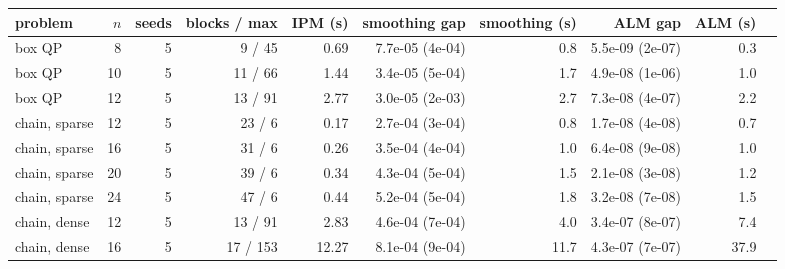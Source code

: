\begin{tabular}{l r r r r r r r r r}\toprule
problem & $n$ & seeds & blocks / max & IPM (s) & smoothing gap & smoothing (s) & ALM gap & ALM (s) \\\midrule
box QP & 8 & 5 & 9 / 45 & 0.69 & 7.7e-05 (4e-04) & 0.8 & 5.5e-09 (2e-07) & 0.3 \\
box QP & 10 & 5 & 11 / 66 & 1.44 & 3.4e-05 (5e-04) & 1.7 & 4.9e-08 (1e-06) & 1.0 \\
box QP & 12 & 5 & 13 / 91 & 2.77 & 3.0e-05 (2e-03) & 2.7 & 7.3e-08 (4e-07) & 2.2 \\
chain, sparse & 12 & 5 & 23 / 6 & 0.17 & 2.7e-04 (3e-04) & 0.8 & 1.7e-08 (4e-08) & 0.7 \\
chain, sparse & 16 & 5 & 31 / 6 & 0.26 & 3.5e-04 (4e-04) & 1.0 & 6.4e-08 (9e-08) & 1.0 \\
chain, sparse & 20 & 5 & 39 / 6 & 0.34 & 4.3e-04 (5e-04) & 1.5 & 2.1e-08 (3e-08) & 1.2 \\
chain, sparse & 24 & 5 & 47 / 6 & 0.44 & 5.2e-04 (5e-04) & 1.8 & 3.2e-08 (7e-08) & 1.5 \\
chain, dense & 12 & 5 & 13 / 91 & 2.83 & 4.6e-04 (7e-04) & 4.0 & 3.4e-07 (8e-07) & 7.4 \\
chain, dense & 16 & 5 & 17 / 153 & 12.27 & 8.1e-04 (9e-04) & 11.7 & 4.3e-07 (7e-07) & 37.9 \\
\bottomrule\end{tabular}
